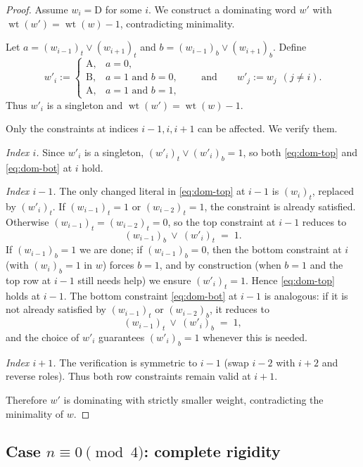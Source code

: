 \documentclass[11pt]{article}
\theoremstyle{plain}
\theoremstyle{definition}
\theoremstyle{remark}
\DeclareMathOperator{\wt}{wt}
\newcommand{\colA}{\mathrm{A}}
\newcommand{\colB}{\mathrm{B}}
\newcommand{\colD}{\mathrm{D}}
\begin{document}
\begin{proof}
Assume $w_i=\colD$ for some $i$.  We construct a dominating word $w'$ with
$\wt(w')=\wt(w)-1$, contradicting minimality.

Let $a=(w_{i-1})_t\vee (w_{i+1})_t$ and $b=(w_{i-1})_b\vee (w_{i+1})_b$.
Define
\[
w'_i :=
\begin{cases}
\colA, & a=0,\\
\colB, & a=1 \text{ and } b=0,\\
\colA, & a=1 \text{ and } b=1,
\end{cases}
\qquad\text{and}\qquad
w'_j:=w_j\ \ (j\neq i).
\]
Thus $w'_i$ is a singleton and $\wt(w')=\wt(w)-1$.

Only the constraints at indices $i-1,i,i+1$ can be affected.  We verify them.

\smallskip\noindent
\emph{Index $i$.}
Since $w'_i$ is a singleton, $(w'_i)_t\vee (w'_i)_b=1$, so both
\eqref{eq:dom-top} and \eqref{eq:dom-bot} at $i$ hold.

\smallskip\noindent
\emph{Index $i-1$.}
The only changed literal in \eqref{eq:dom-top} at $i-1$ is $(w_i)_t$, replaced by $(w'_i)_t$.
If $(w_{i-1})_t=1$ or $(w_{i-2})_t=1$, the constraint is already satisfied.
Otherwise $(w_{i-1})_t=(w_{i-2})_t=0$, so the top constraint at $i-1$ reduces to
\[
(w_{i-1})_b \ \vee\ (w'_i)_t \;=\;1.
\]
If $(w_{i-1})_b=1$ we are done; if $(w_{i-1})_b=0$, then the bottom constraint at $i$
(with $(w_i)_b=1$ in $w$) forces $b=1$, and by construction (when $b=1$ and the top row at $i-1$
still needs help) we ensure $(w'_i)_t=1$.  Hence \eqref{eq:dom-top} holds at $i-1$.
The bottom constraint \eqref{eq:dom-bot} at $i-1$ is analogous: if it is not already satisfied by
$(w_{i-1})_t$ or $(w_{i-2})_b$, it reduces to
\[
(w_{i-1})_t \ \vee\ (w'_i)_b \;=\;1,
\]
and the choice of $w'_i$ guarantees $(w'_i)_b=1$ whenever this is needed.

\smallskip\noindent
\emph{Index $i+1$.}
The verification is symmetric to $i-1$ (swap $i-2$ with $i+2$ and reverse roles).
Thus both row constraints remain valid at $i+1$.

Therefore $w'$ is dominating with strictly smaller weight, contradicting the minimality of $w$.
\end{proof}
\subsection{Case $n\equiv 0\pmod4$: complete rigidity}\label{subsec:mod0}
\end{document}
